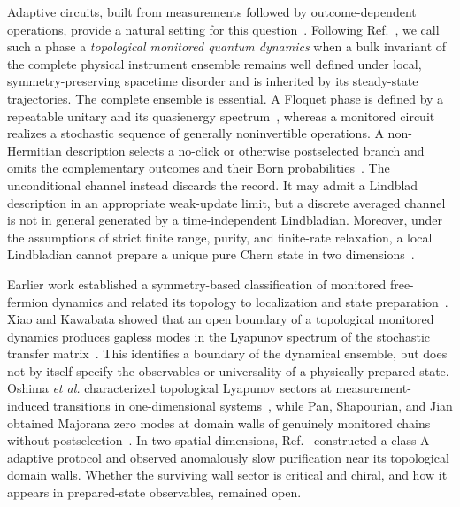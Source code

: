 \documentclass[aps,prl,twocolumn,floatfix,superscriptaddress,nofootinbib]{revtex4-2}
\begin{document}
Adaptive circuits, built from measurements followed by outcome-dependent operations, provide a natural setting for this question~\cite{Skinner2019,LiChenFisher2018,Fisher2023,GullansHuse2020,Roy2020,Puente2024,Smith2024}.  Following Ref.~\cite{BhuiyanPanJian2026}, we call such a phase a \emph{topological monitored quantum dynamics} when a bulk invariant of the complete physical instrument ensemble remains well defined under local, symmetry-preserving spacetime disorder and is inherited by its steady-state trajectories.  The complete ensemble is essential.  A Floquet phase is defined by a repeatable unitary and its quasienergy spectrum~\cite{Kitagawa2010,Lindner2011,Rudner2013,Harper2020}, whereas a monitored circuit realizes a stochastic sequence of generally noninvertible operations.  A non-Hermitian description selects a no-click or otherwise postselected branch and omits the complementary outcomes and their Born probabilities~\cite{KellsMeidanRomito2023}.  The unconditional channel instead discards the record.  It may admit a Lindblad description in an appropriate weak-update limit, but a discrete averaged channel is not in general generated by a time-independent Lindbladian.  Moreover, under the assumptions of strict finite range, purity, and finite-rate relaxation, a local Lindbladian cannot prepare a unique pure Chern state in two dimensions~\cite{Diehl2011,Bardyn2013,BudichZollerDiehl2015,Goldstein2019}.

Earlier work established a symmetry-based classification of monitored free-fermion dynamics and related its topology to localization and state preparation~\cite{BhuiyanPanJian2026,JianBauerKeselmanLudwig2022,Ludwig2013,XiaoKawabata2024,KellsMeidanRomito2023,NahumSkinner2020}.  Xiao and Kawabata showed that an open boundary of a topological monitored dynamics produces gapless modes in the Lyapunov spectrum of the stochastic transfer matrix~\cite{XiaoKawabata2024}.  This identifies a boundary of the dynamical ensemble, but does not by itself specify the observables or universality of a physically prepared state.  Oshima \emph{et al.} characterized topological Lyapunov sectors at measurement-induced transitions in one-dimensional systems~\cite{Oshima2025}, while Pan, Shapourian, and Jian obtained Majorana zero modes at domain walls of genuinely monitored chains without postselection~\cite{PanShapourianJian2025}.  In two spatial dimensions, Ref.~\cite{BhuiyanPanJian2026} constructed a class-A adaptive protocol and observed anomalously slow purification near its topological domain walls.  Whether the surviving wall sector is critical and chiral, and how it appears in prepared-state observables, remained open.
\end{document}
